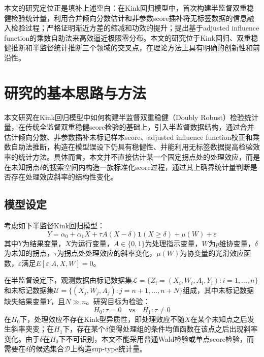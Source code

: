 \documentclass[12pt,a4paper]{ctexart}
\begin{document}
本文的研究定位正是填补上述空白：在Kink回归模型中，首次构建半监督双重稳健检验统计量，利用合并倾向分数估计和非参数score插补将无标签数据的信息融入检验过程；严格证明渐近方差的缩减和功效的提升；提出基于adjusted influence function的乘数自助法来高效逼近极限零分布。本文的研究位于Kink回归、双重稳健推断和半监督统计推断三个领域的交叉点，在理论方法上具有明确的创新性和前沿性。

\section{研究的基本思路与方法}

本文研究在Kink回归模型中如何构建半监督双重稳健（Doubly Robust）检验统计量，在传统全监督双重稳健score检验的基础上，引入半监督数据结构，通过合并估计倾向分数、非参数插补未标记样本score、adjusted influence function校正和乘数自助法推断，构造在模型误设下仍具有稳健性、并能利用无标签数据提高检验效率的统计方法。具体而言，本文并不直接估计某一个固定拐点处的处理效应，而是在未知拐点$\delta$的搜索空间内构造一族标准化score过程，通过其上确界统计量判断是否存在处理效应斜率的结构性变化。

\subsection{模型设定}

考虑如下半监督Kink回归模型：
\begin{equation}
Y = \alpha_0 + \alpha_1 X + \tau A(X - \delta)\mathbf{1}(X \geq \delta) + \mu(W) + \varepsilon
\label{eq:model}
\end{equation}
其中$Y$为结果变量，$X$为运行变量，$A\in\{0,1\}$为处理指示变量，$W$为$p$维协变量，$\delta$为未知的拐点，$\tau$为拐点处处理效应的斜率变化，$\mu(W)$为协变量的光滑效应函数，$\varepsilon$满足$E[\varepsilon|A,X,W] = 0$。

在半监督设定下，观测数据由标记数据集$\mathcal{L} = \{Z_i = (X_i, W_i, A_i, Y_i): i=1,\ldots,n\}$和未标记数据集$\mathcal{U} = \{(X_j, W_j, A_j): j=n+1,\ldots,n+N\}$组成，其中未标记数据缺失结果变量$Y$，且$N \gg n$。研究目标为检验：
\begin{equation}
H_0: \tau = 0 \quad \text{vs} \quad H_1: \tau \neq 0
\label{eq:hypothesis}
\end{equation}
在$H_0$下，处理效应不存在Kink型异质性，即处理效应不随$X$在某个未知点之后发生斜率突变；在$H_1$下，存在某个$\delta$使得处理组的条件均值函数在该点之后出现斜率变化。由于$\delta$在$H_0$下不可识别，本文不能采用普通Wald检验或单点score检验，而需要在$\delta$的候选集合$\mathcal{D}$上构造sup-type统计量。
\end{document}
